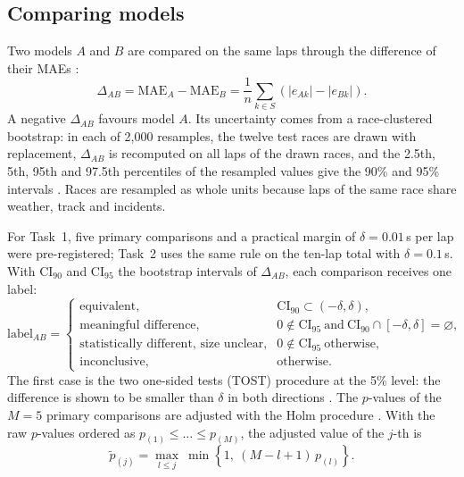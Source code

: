 \documentclass[12pt]{article}
\begin{document}
\subsection{Comparing models}\label{sec:rules}

Two models $A$ and $B$ are compared on the same laps through the difference of their MAEs \parencite{diebold1995}:
\begin{equation}\label{eq:delta}
  \Delta_{AB} = \text{MAE}_A-\text{MAE}_B = \frac{1}{n}\sum_{k\in S}\left(\left|e_{Ak}\right|-\left|e_{Bk}\right|\right).
\end{equation}
A negative $\Delta_{AB}$ favours model $A$. Its uncertainty comes from a race-clustered bootstrap: in each of 2,000
resamples, the twelve test races are drawn with replacement, $\Delta_{AB}$ is recomputed on all laps of the drawn races,
and the 2.5th, 5th, 95th and 97.5th percentiles of the resampled values give the 90\% and 95\% intervals
\parencite{efron1979,cameron2008}. Races are resampled as whole units because laps of the same race share weather, track
and incidents.

For Task~1, five primary comparisons and a practical margin of $\delta=0.01$\,s per lap were pre-registered; Task~2
uses the same rule on the ten-lap total with $\delta=0.1$\,s. With $\text{CI}_{90}$ and $\text{CI}_{95}$ the bootstrap
intervals of $\Delta_{AB}$, each comparison receives one label:
\begin{equation}\label{eq:labels}
  \text{label}_{AB} =
  \begin{cases}
    \text{equivalent}, & \text{CI}_{90}\subset(-\delta,\delta),\\
    \text{meaningful difference}, & 0\notin\text{CI}_{95}\ \text{and}\ \text{CI}_{90}\cap[-\delta,\delta]=\varnothing,\\
    \text{statistically different, size unclear}, & 0\notin\text{CI}_{95}\ \text{otherwise},\\
    \text{inconclusive}, & \text{otherwise}.
  \end{cases}
\end{equation}
The first case is the two one-sided tests (TOST) procedure at the 5\% level: the difference is shown to be smaller
than $\delta$ in both directions \parencite{schuirmann1987,lakens2017}. The $p$-values of the $M=5$ primary comparisons
are adjusted with the Holm procedure \parencite{holm1979}. With the raw $p$-values ordered as
$p_{(1)}\le\dots\le p_{(M)}$, the adjusted value of the $j$-th is
\begin{equation}\label{eq:holm}
  \tilde p_{(j)} = \max_{l\le j}\ \min\!\left\{1,\ (M-l+1)\,p_{(l)}\right\}.
\end{equation}
\end{document}
